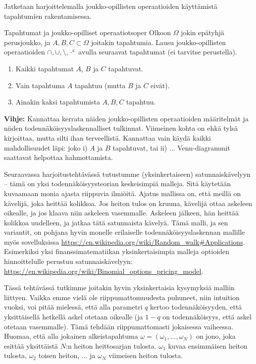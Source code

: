 \documentclass[11pt,a4paper]{amsart}
\newcommand{\1}{\mathbf{1}}
\begin{document}
Jatketaan harjoittelemalla joukko-opillisten operaatioiden käyttämistä tapahtumien rakentamisessa.
\begin{Exercises}{Tapahtumat ja joukko-opilliset operaatiot}{soper}
Olkoon $\Omega$ jokin epätyhjä perusjoukko, ja $A,B,C\subset \Omega$ joitakin tapahtumia. Lausu joukko-opillisten operaatioiden $\cap,\cup,\setminus,\cdot^\mathsf c$ avulla seuraavat tapahtumat (ei tarvitse perustella). 
\begin{enumerate}
\item Kaikki tapahtumat $A$, $B$ ja $C$ tapahtuvat.
\item Vain tapahtuma $A$ tapahtuu (mutta $B$ ja $C$ eivät).
\item Ainakin kaksi tapahtumista $A,B,C$ tapahtuu. 
\end{enumerate}
{\bf Vihje:} Kannattaa kerrata näiden joukko-opillisten operaatioiden määritelmät ja niiden todennäköisyyslaskennalliset tulkinnat. Viimeinen kohta on ehkä tylsä kirjoittaa, mutta silti ihan terveellistä. Kannattaa vain käydä kaikki mahdollisuudet läpi: joko i) $A$ ja $B$ tapahtuvat, tai ii) ... Venn-diagrammit saattavat helpottaa hahmottamista.
\end{Exercises}


Seuraavassa harjoitustehtävässä tutustumme (yksinkertaiseen) satunnaiskävelyyn – tämä on yksi todennäköisyysteorian keskeisimpiä malleja. Sitä käytetään kuvaamaan monia ajasta riippuvia ilmiöitä. Ajatus mallissa on, että meillä on kävelijä, joka heittää kolikkoa. Jos heiton tulos on kruuna, kävelijä ottaa askeleen oikealle, ja jos klaava niin askeleen vasemmalle. Askeleen jälkeen, hän heittää kolikkoa uudelleen, ja jatkaa tätä satunnaista kävelyä. Tämä malli, ja sen variantit, on pohjana hyvin monelle erilaiselle todennäköisyyslaskennan mallille myös sovelluksissa \url{https://en.wikipedia.org/wiki/Random_walk#Applications}. Esimerkiksi yksi finanssimatematiikan yksinkertaisimpia malleja optioiden hinnoittelulle perustuu satunnaiskävelyyn: \url{https://en.wikipedia.org/wiki/Binomial_options_pricing_model}. 

Tässä tehtävässä tutkimme joitakin hyvin yksinkertaisia kysymyksiä malliin liittyen. Vaikka emme vielä ole riippumattomuudesta puhuneet, niin intuition vuoksi, voi pitää mielessä, että alla parametri $q$ kertoo todennäköisyyden, että yksittäisellä hetkellä askel otetaan oikealle (ja $1-q$ on todennäköisyys, että askel otetaan vasemmalle). Tämä tehdään riippumattomasti jokaisessa vaiheessa. Huomaa, että alla jokainen alkeistapahtuma $\omega=(\omega_1,...,\omega_N)$ on jono, joka esittää yksittäistä $N$:n heiton heittosarjan tulosta. $\omega_1$ kuvaa ensimmäisen heiton tulosta, $\omega_2$ toisen heiton, ...  ja $\omega_N$ viimeisen heiton tulosta.
\end{document}
